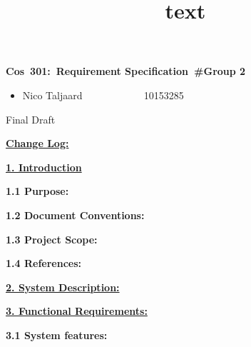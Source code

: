 \documentclass[12pt]{article}
\newcommand{\Title}{Requirement Specification\ \#Group 2} %
\newcommand{\Class}{Cos\ 301} %
\begin{document}
\title{text}
	\vspace{2in}
	\hspace{1.2in}
	\textmd{\textbf{\Class:\ \Title}}\\
	\vspace{2in}


\begin{itemize} %
	\item Nico Taljaard \ ~~~~~~~~~ \ 10153285
\end{itemize}

\vspace{2in}
\hspace{2.5in} 
	Final Draft

\newpage
	\textbf{\underline{Change Log:}}
	
	
	
\newpage
	\textbf{\underline{1. Introduction}}
	
	\vspace{0.2in}

		\textbf{1.1 Purpose:}
		\vspace{0.1in}
		
	
	\vspace{0.2in}
	
		\textbf{1.2 Document Conventions:} %
		\vspace{0.1in}
		
	
	\vspace{0.2in}
	
		\textbf{1.3 Project Scope:}
		\vspace{0.1in}
		
		
	
	\vspace{0.2in}
	
		\textbf{1.4 References:}
		\vspace{0.1in}
			
	
	\vspace{0.5in}
	
	\textbf{\underline{2. System Description:}}
	\vspace{0.2in}
	
	
	
	\vspace{0.5in}
	
	\newpage
	\textbf{\underline{3. Functional Requirements:}}
	\vspace{0.2in}
		
		\textbf{3.1 System features:} %
		\vspace{0.1in}
		
\end{document}
